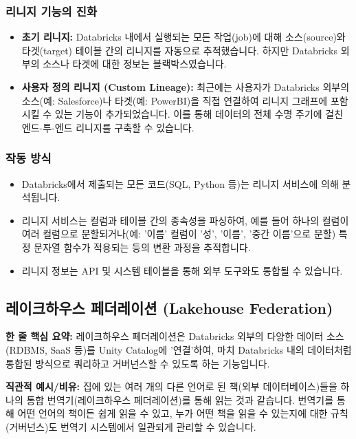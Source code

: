 \documentclass[11pt,a4paper]{article}
\theoremstyle{definition}
\begin{document}
\subsubsection*{리니지 기능의 진화}
\begin{itemize}
    \item \textbf{초기 리니지:} Databricks 내에서 실행되는 모든 작업(job)에 대해 소스(source)와 타겟(target) 테이블 간의 리니지를 자동으로 추적했습니다. 하지만 Databricks 외부의 소스나 타겟에 대한 정보는 블랙박스였습니다.
    \item \textbf{사용자 정의 리니지 (Custom Lineage):} 최근에는 사용자가 Databricks 외부의 소스(예: Salesforce)나 타겟(예: PowerBI)을 직접 연결하여 리니지 그래프에 포함시킬 수 있는 기능이 추가되었습니다. 이를 통해 데이터의 전체 수명 주기에 걸친 엔드-투-엔드 리니지를 구축할 수 있습니다.
\end{itemize}

\subsubsection*{작동 방식}
\begin{itemize}
    \item Databricks에서 제출되는 모든 코드(SQL, Python 등)는 리니지 서비스에 의해 분석됩니다.
    \item 리니지 서비스는 컬럼과 테이블 간의 종속성을 파싱하여, 예를 들어 하나의 컬럼이 여러 컬럼으로 분할되거나(예: '이름' 컬럼이 '성', '이름', '중간 이름'으로 분할) 특정 문자열 함수가 적용되는 등의 변환 과정을 추적합니다.
    \item 리니지 정보는 API 및 시스템 테이블을 통해 외부 도구와도 통합될 수 있습니다.
\end{itemize}

\newpage
\subsection*{레이크하우스 페더레이션 (Lakehouse Federation)}

\begin{keyconceptbox}
\textbf{한 줄 핵심 요약:} 레이크하우스 페더레이션은 Databricks 외부의 다양한 데이터 소스(RDBMS, SaaS 등)를 Unity Catalog에 '연결'하여, 마치 Databricks 내의 데이터처럼 통합된 방식으로 쿼리하고 거버넌스할 수 있도록 하는 기능입니다.
\end{keyconceptbox}

\textbf{직관적 예시/비유:}
집에 있는 여러 개의 다른 언어로 된 책(외부 데이터베이스)들을 하나의 통합 번역기(레이크하우스 페더레이션)를 통해 읽는 것과 같습니다. 번역기를 통해 어떤 언어의 책이든 쉽게 읽을 수 있고, 누가 어떤 책을 읽을 수 있는지에 대한 규칙(거버넌스)도 번역기 시스템에서 일관되게 관리할 수 있습니다.
\end{document}
